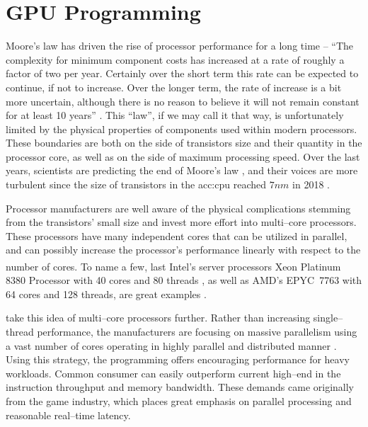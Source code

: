 \chapter{GPU Programming}
\label{chap:gpu}

Moore's law has driven the rise of processor performance for a long time -- \enquote{The complexity for minimum component costs has increased at a rate of roughly a factor of two per year. Certainly over the short term this rate can be expected to continue, if not to increase. Over the longer term, the rate of increase is a bit more uncertain, although there is no reason to believe it will not remain constant for at least 10 years} \citep{MooresLaw}. This \enquote{law}, if we may call it that way, is unfortunately limited by the physical properties of components used within modern processors. 
These boundaries are both on the side of transistors size and their quantity in the processor core, as well as on the side of maximum processing speed. 
Over the last years, scientists are predicting the end of Moore's law \citep{MooresLawEnd}, and their voices are more turbulent since the size of transistors in the \acrfull{acc:cpu} reached $7nm$ in 2018 \citep{SamsungSevenNm}. 

Processor manufacturers are well aware of the physical complications stemming from the transistors' small size and invest more effort into multi--core processors. These processors have many independent cores that can be utilized in parallel, and can possibly increase the processor's performance linearly with respect to the number of cores. To name a few, last Intel's server processors Xeon\textsuperscript{\textregistered} Platinum 8380 Processor with 40 cores and 80 threads \citep{IntelXeonPlatinum}, as well as AMD's EPYC\texttrademark\ 7763 with 64 cores and 128 threads, are great examples \citep{AMDEpyc}.

 take this idea of multi--core processors further. Rather than increasing single--thread performance, the \gpu manufacturers are focusing on massive parallelism using a vast number of cores operating in highly parallel and distributed manner \citep{GPUComputingOwens}. Using this strategy, the \gpu programming offers encouraging performance for heavy workloads. Common consumer  can easily outperform current high--end  in the instruction throughput and memory bandwidth. These demands came originally from the game industry, which places great emphasis on parallel processing and reasonable real--time latency.

